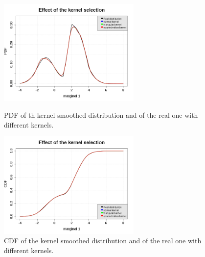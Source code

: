              \begin{figure}[H]
               \begin{minipage}{7cm}
                 \begin{center}
                   \includegraphics[width=7cm]{Figures/kernelSmoothing_pdf.png}
                   \caption{PDF of th kernel smoothed distribution and of the real one with different kernels.}
                   \label{pdf_KernelSmooth}
                 \end{center}
               \end{minipage}
               \hfill
               \begin{minipage}{7cm}
                 \begin{center}
                   \includegraphics[width=7cm]{Figures/kernelSmoothing_cdf.png}
                   \caption{CDF of the kernel smoothed distribution and of the real one with different kernels.}
                   \label{cdf_KernelSmooth}
                 \end{center}
               \end{minipage}
             \end{figure}


